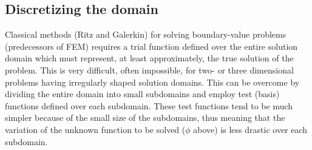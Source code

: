 \subsection{Discretizing the domain}
 Classical methods (Ritz and Galerkin) for solving boundary-value problems (predecessors of FEM) requires a trial function defined over the entire solution domain which must represent, at least approximately, the true solution of the problem\cite{FEM_in_EM_jianming_jin}. This is very difficult, often impossible, for two- or three dimensional problems having irregularly shaped solution domains. This can be overcome by dividing the entire domain into small subdomains and employ test (basis) functions defined over each subdomain. These test functions tend to be much simpler because of the small size of the subdomains, thus meaning that the variation of the unknown function to be solved ($\phi$ above) is less drastic over each subdomain.
